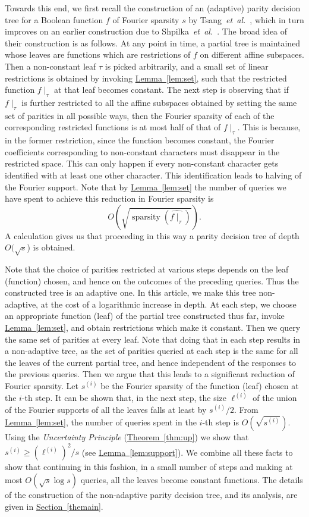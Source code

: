 \documentclass[11pt]{article}
\numberwithin{equation}{section}
\theoremstyle{definition}
\theoremstyle{plain}
\newcommand{\expref}[2]{\hyperref[#2]{#1~\ref{#2}}}
\DeclareMathOperator{\spa}{sparsity}
\newcommand{\etal}{{\it et~al.}}
\newcommand{\lref}[2][]{\hyperref[#2]{#1~\ref*{#2}}}
\begin{document}
Towards this end, we first recall the construction of an
(adaptive) parity decision tree for a Boolean function $f$ of Fourier sparsity $s$ by Tsang~\etal~\cite{tsang}, which in
turn improves on an earlier construction due to 
Shpilka~\etal~\cite[Theorem~1.1]{DBLP:conf/innovations/ShpilkaTV14}.
The broad idea of their
construction is as follows. %
At any point in time, a partial
tree is maintained whose leaves are functions which are restrictions of $f$ on different affine subspaces. Then a non-constant
leaf $\tau$ is picked arbitrarily, and a small set
of linear restrictions is obtained by invoking \lref[Lemma]{lem:set}, such that the restricted function $f\mid_\tau$ at that leaf becomes
constant. The next step is observing that if $f\mid_\tau$ is further restricted to
all the affine subspaces obtained by setting the same set of 
parities in all possible ways, then the Fourier sparsity of each of the corresponding restricted functions
is at most half of that of $f\mid_\tau$. This is because, in
the former restriction, since the function becomes constant, the
Fourier coefficients corresponding to non-constant characters must
disappear in the restricted space. This can only happen if every
non-constant character gets identified with at least one
other character. This identification leads to halving of the Fourier
support. Note that by \lref[Lemma]{lem:set} the number of queries we have spent to achieve this reduction in Fourier sparsity is
\[
  O\left(\sqrt{\spa(\widehat{f\mid_\tau})}\right).
\]
A calculation gives us that proceeding in this way a parity decision tree
of depth $O(\sqrt{s}$) is obtained. 


Note that the choice of parities restricted at various steps depends on the leaf (function)
chosen, and hence on the outcomes of the preceding queries. Thus the
constructed tree is an adaptive one. In this article, we make this
tree non-adaptive, at the cost of a logarithmic increase in depth. At each
step, we choose an appropriate function (leaf) of the partial tree constructed thus far, invoke
\lref[Lemma]{lem:set}, and obtain restrictions which make it
constant. Then we query the same set of parities at every
leaf. Note that doing that in each step results in a non-adaptive tree, as the set of parities
queried at each step is the same for all the leaves of the current partial tree, and hence independent of the responses to the previous queries. Then we argue that this leads to a significant
reduction of Fourier sparsity. 
Let $s^{(i)}$ be the Fourier sparsity of the function (leaf)
chosen at the $i$-th step. It can be shown that, in the next step, 
the size $\ell^{(i)}$ of the union of the Fourier supports of all the leaves falls at least
by $s^{(i)}/2$. {}From \lref[Lemma]{lem:set}, the number of queries
spent in the $i$-th step is $O(\sqrt{s^{(i)}})$. Using the
\emph{Uncertainty Principle} (\lref[Theorem]{thm:up}) we show that 
$s^{(i)} \geq \left(\ell^{(i)}\right)^2/s$ (see \expref{Lemma}{lem:support}). We combine all these facts to show that continuing in
this fashion, in a small number of steps and making at most $O(\sqrt{s} \log s)$
queries, all the leaves become constant functions. The details of the construction of the
non-adaptive parity decision tree, and its analysis, are given in \lref[Section]{themain}.
\end{document}
